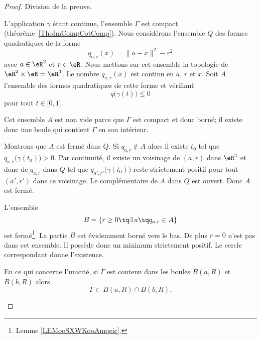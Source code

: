\begin{proof}
	Division de la preuve.
	\begin{subproof}
		\spitem[Existence]
		L'application \( \gamma\) étant continue, l'ensemble \( \Gamma\) est compact (théorème~\ref{ThoImCompCotComp}). Nous considérons l'ensemble \( Q\) des formes quadratiques de la forme
		\begin{equation}
			q_{a,r}(x)=\| a-x \|^2-r^2
		\end{equation}
		avec \( a\in \eR^2\) et \( r\in \eR\). Nous mettons sur cet ensemble la topologie de \( \eR^2\times \eR=\eR^3\). Le nombre \( q_{a,r}(x)\) est continu en \( a\), \( r\) et \( x\). Soit \( A\) l'ensemble des formes quadratiques de cette forme et vérifiant
		\begin{equation}
			q\big( \gamma(t) \big)\leq 0
		\end{equation}
		pour tout \( t\in\mathopen[ 0 , 1 \mathclose]\).

		Cet ensemble \( A\) est non vide parce que \( \Gamma \) est compact et donc borné; il existe donc une boule qui contient \( \Gamma\) en son intérieur.

		Montrons que \( A\) est fermé dans \( Q\). Si \( q_{a,r}\notin A\) alors il existe \( t_0\) tel que \( q_{a,r}\big( \gamma(t_0) \big)>0\). Par continuité, il existe un voisinage de \( (a,r)\) dans \( \eR^3\)  et donc de \( q_{a,r}\) dans \( Q\) tel que \( q_{a',r'}\big( \gamma(t_0) \big)\) reste strictement positif pour tout \( (a',r')\) dans ce voisinage. Le complémentaire de \( A\) dans \( Q\) est ouvert. Donc \( A\) est fermé.

		L'ensemble
		\begin{equation}
			B=\{ r\geq 0\tq \exists\,a \tq q_{a,r}\in A \}
		\end{equation}
		est fermé\footnote{Lemme \ref{LEMooSXWKooAmqeic}.}. La partie \( B\) est évidemment borné vers le bas. De plus \( r=0\) n'est pas dans cet ensemble. Il possède donc un minimum strictement positif. Le cercle correspondant donne l'existence.
		\spitem[Unicité]

		En ce qui concerne l'unicité, si \( \Gamma\) est contenu dans les boules \( B(a,R)\) et \( B(b,R)\) alors
		\begin{equation}
			\Gamma\subset B(a,R)\cap B(b,R).
		\end{equation}

		\begin{center}
			
		\end{center}


\end{subproof}
\end{proof}
